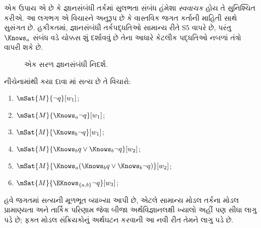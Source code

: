 \documentclass[../../../include/open-logic-section]{subfiles}
\begin{document}
એક ઉપાય એ છે કે જ્ઞાનસંબંધી તર્કમાં સુલભતા સંબંધ હંમેશા
\emph{સ્વવાચક} હોય તે સુનિશ્ચિત કરીએ. આ લગભગ એ વિચારને અનુરૂપ
છે કે વાસ્તવિક જગત કર્તાની માહિતી સાથે સુસંગત છે. હકીકતમાં,
જ્ઞાનસંબંધી તર્કપદ્ધતિઓ સામાન્ય રીતે S5 વાપરે છે, પરંતુ
$\Knows_a$ સંબંધ વડે ચોક્કસ શું દર્શાવવું છે તેના આધારે
કેટલીક પદ્ધતિઓ નબળાં તંત્રો વાપરી શકે છે.

\begin{figure}
  \begin{center}
  \end{center}
  \caption{એક સરળ જ્ઞાનસંબંધી નિદર્શ.}
\end{figure}

\begin{prob}
  નીચેનામાંથી કયા દાવા
  માં સત્ય છે તે વિચારો:
  \begin{enumerate}
    \item $\mSat{M}{\lnot q}[w_1]$;
    \item $\mSat{M}{\Knows_a \lnot q}[w_1]$;
    \item $\mSat{M}{\Knows_b \lnot q}[w_1]$;
    \item $\mSat{M}{\Knows_b q \lor \Knows_b \lnot q}[w_2]$;
    \item $\mSat{M}{\Knows_a( \Knows_b q \lor \Knows_b \lnot q)}[w_2]$;
    \item $\mSat{M}{\EKnows_{\{a,b\}} \lnot q}[w_3]$;
    \end{enumerate}
\end{prob}

હવે જગતમાં સત્યની મૂળભૂત વ્યાખ્યા આપી છે, એટલે સામાન્ય મોડલ
તર્કના મોડલ પ્રામાણ્યતા અને તાર્કિક પરિણામ જેવા બીજા
અર્થવિજ્ઞાનલક્ષી ખ્યાલો અહીં પણ સીધા લાગુ પડે છે; ફક્ત મોડલ
સંક્રિયકોનું અર્થઘટન કરવાની આ નવી રીત તેમને લાગુ પડે છે.
\end{document}
